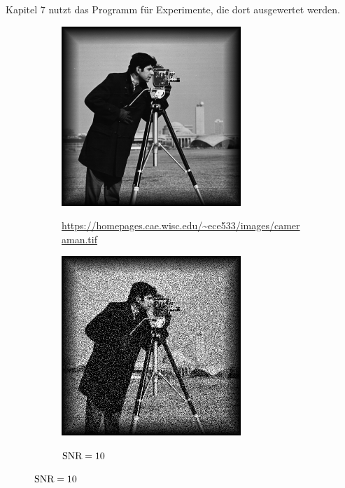 Kapitel 7 nutzt das Programm für Experimente, die dort ausgewertet werden.

\begin{figure}[h]
  \centering
  \begin{subfigure}[b]{.4\linewidth}
    \caption{\url{https://homepages.cae.wisc.edu/~ece533/images/cameraman.tif}}
    \includegraphics[width=\linewidth]{pictures/introBeta/cameraman.png}
    \label{fig:camerman}
  \end{subfigure}
  \quad
  \begin{subfigure}[b]{.4\linewidth}
    \caption{$\textup{SNR}=10$}
    \includegraphics[width=\linewidth]{pictures/introBeta/snr10.png}
    \label{fig:camermanSNR10}
  \end{subfigure}


\end{figure}
